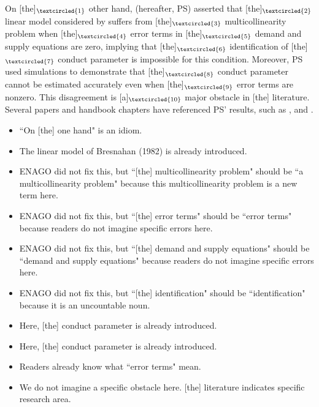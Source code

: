 \documentclass[11pt, a4paper]{article}
\begin{document}
\newpage
[Paragraph 3]

On [the]$_{\textcircled{1}}$ other hand, \citet{perloff2012collinearity} (hereafter, PS) asserted that [the]$_{\textcircled{2}}$ linear model considered by \citet{bresnahan1982oligopoly} suffers from [the]$_{\textcircled{3}}$ multicollinearity problem when [the]$_{\textcircled{4}}$ error terms in [the]$_{\textcircled{5}}$ demand and supply equations are zero, implying that [the]$_{\textcircled{6}}$ identification of [the]$_{\textcircled{7}}$ conduct parameter is impossible for this condition.
Moreover, PS used simulations to demonstrate that [the]$_{\textcircled{8}}$ conduct parameter cannot be estimated accurately even when [the]$_{\textcircled{9}}$ error terms are nonzero. 
This disagreement is [a]$_{\textcircled{10}}$ major obstacle in [the] literature. 
Several papers and handbook chapters have referenced PS’ results, such as \citet{claessensWhatDrivesBank2004, coccoreseMultimarketContactCompetition2013, coccoreseWhatAffectsBank2021, garciaMarketStructuresProduction2020, kumbhakarNewMethodEstimating2012, perekhozhukRegionalLevelAnalysisOligopsony2015}, and \citet{shafferMarketPowerCompetition2017}.

\begin{itemize}
    \item[\textcircled{1}]  ``On [the] one hand" is an idiom. 
    \item[\textcircled{2}] The linear model of Bresnahan (1982) is already introduced.
    \item[\textcircled{3}] ENAGO did not fix this, but ``[the] multicollinearity problem" should be ``a multicollinearity problem" because this multicollinearity problem is a new term here.
    \item[\textcircled{4}] ENAGO did not fix this, but ``[the] error terms" should be ``error terms" because readers do not imagine specific errors here.
    \item[\textcircled{5}] ENAGO did not fix this, but ``[the] demand and supply equations" should be ``demand and supply equations" because readers do not imagine specific errors here.
    \item[\textcircled{6}] ENAGO did not fix this, but ``[the] identification" should be ``identification" because it is an uncountable noun.
    \item[\textcircled{7}]  Here, [the] conduct parameter is already introduced. 
    \item[\textcircled{8}] Here, [the] conduct parameter is already introduced. 
    \item[\textcircled{9}]  Readers already know what ``error terms"  mean.
    \item[\textcircled{10}] We do not imagine a specific obstacle here. [the] literature indicates specific research area.
\end{itemize}
\end{document}
